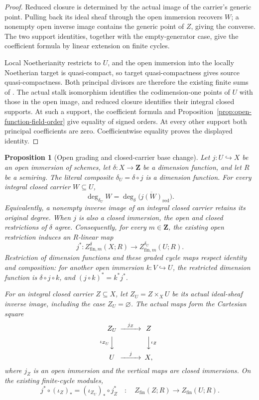 \documentclass[11pt]{article}
\newtheorem{proposition}[theorem]{Proposition}
\theoremstyle{definition}
\theoremstyle{remark}
\begin{document}
\begin{proof}
Reduced closure is determined by the actual image of the carrier's
generic point. Pulling back its ideal sheaf through the open immersion
recovers \(W\); a nonempty open inverse image contains the generic
point of \(Z\), giving the converse. The two support identities,
together with the empty-generator case, give the coefficient formula
by linear extension on finite cycles.

Local Noetherianity restricts to \(U\), and the open immersion into
the locally Noetherian target is quasi-compact, so target
quasi-compactness gives source quasi-compactness. Both principal
divisors are therefore the existing finite sums of
\cite{StacksPrincipalWeilDivisor}. The actual stalk isomorphism
identifies the codimension-one points of \(U\) with those in the
open image, and reduced closure identifies their integral closed
supports. At such a support, the coefficient formula and
Proposition~\ref{prop:open-function-field-order} give equality of
signed orders. At every other support both principal coefficients
are zero. Coefficientwise equality proves the displayed identity.
\end{proof}

\begin{proposition}[Open grading and closed-carrier base change]
\label{prop:open-grading-base-change}
Let \(j:U\hookrightarrow X\) be an open immersion of schemes,
let \(\delta:X\to\mathbf Z\) be a dimension function, and let
\(R\) be a semiring. The literal composite
\(\delta_U=\delta\circ j\) is a dimension function. For every
integral closed carrier \(W\subseteq U\),
\[
\deg_{\delta_U}W
   =\deg_\delta\bigl(\overline{j(W)}_{\mathrm{red}}\bigr).
\]
Equivalently, a nonempty inverse image of an integral closed carrier
retains its original degree. When \(j\) is also a closed immersion,
the open and closed restrictions of \(\delta\) agree.
Consequently, for every \(m\in\mathbf Z\), the existing open
restriction induces an \(R\)-linear map
\[
 j^*:Z^\delta_{\mathrm{fin},m}(X;R)
      \longrightarrow Z^{\delta_U}_{\mathrm{fin},m}(U;R).
\]
Restriction of dimension functions and these graded cycle maps respect
identity and composition: for another open immersion
\(k:V\hookrightarrow U\), the restricted dimension function is
\(\delta\circ j\circ k\), and \((j\circ k)^*=k^*j^*\).

For an integral closed carrier \(Z\subseteq X\), let
\(Z_U=Z\times_X U\) be its actual ideal-sheaf inverse image,
including the case \(Z_U=\varnothing\). The actual maps form the
Cartesian square
\[
\begin{CD}
 Z_U @>{j_Z}>> Z\\
 @V{\iota_{Z_U}}VV @VV{\iota_Z}V\\
 U @>{j}>> X,
\end{CD}
\]
where \(j_Z\) is an open immersion and the vertical maps are
closed immersions. On the existing finite-cycle modules,
\[
 j^*\circ(\iota_Z)_*
       =(\iota_{Z_U})_*\circ j_Z^*
 \quad:\quad Z_{\mathrm{fin}}(Z;R)
                 \longrightarrow Z_{\mathrm{fin}}(U;R).
\]
\end{proposition}
\end{document}
